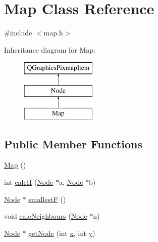 \hypertarget{class_map}{}\section{Map Class Reference}
\label{class_map}


{\ttfamily \#include $<$map.\+h$>$}

Inheritance diagram for Map\+:\begin{figure}[H]
\begin{center}
\leavevmode
\includegraphics[height=3.000000cm]{class_map}
\end{center}
\end{figure}
\subsection*{Public Member Functions}
\begin{DoxyCompactItemize}
\item 
\hyperlink{class_map_a0f5ad0fd4563497b4214038cbca8b582}{Map} ()
\item 
int \hyperlink{class_map_a0c1055f7616a6779a7f5f1d561a8ccb2}{calcH} (\hyperlink{class_node}{Node} $\ast$a, \hyperlink{class_node}{Node} $\ast$b)
\item 
\hyperlink{class_node}{Node} $\ast$ \hyperlink{class_map_a19461c64e6da374e8022d210a6930867}{smallestF} ()
\item 
void \hyperlink{class_map_adac9fc32a2c840b40e1417292e846fe2}{calc\+Neighbours} (\hyperlink{class_node}{Node} $\ast$n)
\item 
\hyperlink{class_node}{Node} $\ast$ \hyperlink{class_map_a9500f43b02ce38b5e89248bd6e257858}{get\+Node} (int \hyperlink{class_node_aff1029a518bdc2651007b8856f958364}{x}, int \hyperlink{class_node_aa3e5b5240023b4528ae85057b3324202}{y})
\end{DoxyCompactItemize}
